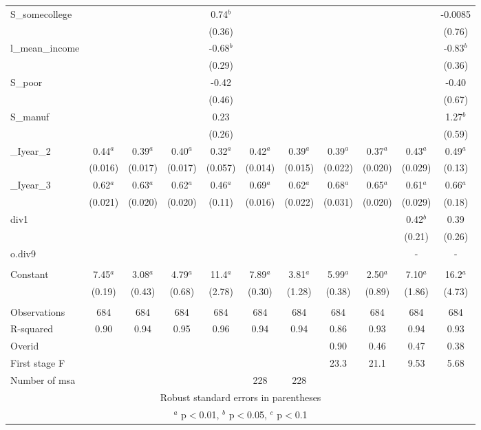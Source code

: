 \documentclass[]{article}
\begin{document}
\begin{tabular}{lcccccccccc}
S\_somecollege &  &  &  & 0.74$^b$ &  &  &  &  &  & -0.0085 \\
 &  &  &  & (0.36) &  &  &  &  &  & (0.76) \\
l\_mean\_income &  &  &  & -0.68$^b$ &  &  &  &  &  & -0.83$^b$ \\
 &  &  &  & (0.29) &  &  &  &  &  & (0.36) \\
S\_poor &  &  &  & -0.42 &  &  &  &  &  & -0.40 \\
 &  &  &  & (0.46) &  &  &  &  &  & (0.67) \\
S\_manuf &  &  &  & 0.23 &  &  &  &  &  & 1.27$^b$ \\
 &  &  &  & (0.26) &  &  &  &  &  & (0.59) \\
\_Iyear\_2 & 0.44$^a$ & 0.39$^a$ & 0.40$^a$ & 0.32$^a$ & 0.42$^a$ & 0.39$^a$ & 0.39$^a$ & 0.37$^a$ & 0.43$^a$ & 0.49$^a$ \\
 & (0.016) & (0.017) & (0.017) & (0.057) & (0.014) & (0.015) & (0.022) & (0.020) & (0.029) & (0.13) \\
\_Iyear\_3 & 0.62$^a$ & 0.63$^a$ & 0.62$^a$ & 0.46$^a$ & 0.69$^a$ & 0.62$^a$ & 0.68$^a$ & 0.65$^a$ & 0.61$^a$ & 0.66$^a$ \\
 & (0.021) & (0.020) & (0.020) & (0.11) & (0.016) & (0.022) & (0.031) & (0.020) & (0.029) & (0.18) \\
div1 &  &  &  &  &  &  &  &  & 0.42$^b$ & 0.39 \\
 &  &  &  &  &  &  &  &  & (0.21) & (0.26) \\
o.div9 &  &  &  &  &  &  &  &  & - & - \\
 &  &  &  &  &  &  &  &  &  &  \\
Constant & 7.45$^a$ & 3.08$^a$ & 4.79$^a$ & 11.4$^a$ & 7.89$^a$ & 3.81$^a$ & 5.99$^a$ & 2.50$^a$ & 7.10$^a$ & 16.2$^a$ \\
 & (0.19) & (0.43) & (0.68) & (2.78) & (0.30) & (1.28) & (0.38) & (0.89) & (1.86) & (4.73) \\
 &  &  &  &  &  &  &  &  &  &  \\
Observations & 684 & 684 & 684 & 684 & 684 & 684 & 684 & 684 & 684 & 684 \\
R-squared & 0.90 & 0.94 & 0.95 & 0.96 & 0.94 & 0.94 & 0.86 & 0.93 & 0.94 & 0.93 \\
Overid &  &  &  &  &  &  & 0.90 & 0.46 & 0.47 & 0.38 \\
First stage F &  &  &  &  &  &  & 23.3 & 21.1 & 9.53 & 5.68 \\
 Number of msa &  &  &  &  & 228 & 228 &  &  &  &  \\ \hline
\multicolumn{11}{c}{ Robust standard errors in parentheses} \\
\multicolumn{11}{c}{ $^a$ p$<$0.01, $^b$ p$<$0.05, $^c$ p$<$0.1} \\
\end{tabular}
\end{document}
